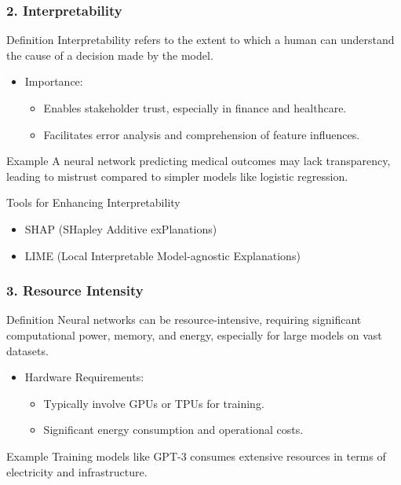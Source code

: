 \documentclass[aspectratio=169]{beamer}
\begin{document}
\begin{frame}[fragile]
    \frametitle{2. Interpretability}
    \begin{block}{Definition}
        Interpretability refers to the extent to which a human can understand the cause of a decision made by the model. 
    \end{block}
    \begin{itemize}
        \item Importance:
        \begin{itemize}
            \item Enables stakeholder trust, especially in finance and healthcare.
            \item Facilitates error analysis and comprehension of feature influences.
        \end{itemize}
    \end{itemize}
    \begin{block}{Example}
        A neural network predicting medical outcomes may lack transparency, leading to mistrust compared to simpler models like logistic regression.
    \end{block}
    \begin{block}{Tools for Enhancing Interpretability}
        \begin{itemize}
            \item SHAP (SHapley Additive exPlanations)
            \item LIME (Local Interpretable Model-agnostic Explanations)
        \end{itemize}
    \end{block}
\end{frame}

\begin{frame}[fragile]
    \frametitle{3. Resource Intensity}
    \begin{block}{Definition}
        Neural networks can be resource-intensive, requiring significant computational power, memory, and energy, especially for large models on vast datasets.
    \end{block}
    \begin{itemize}
        \item Hardware Requirements:
        \begin{itemize}
            \item Typically involve GPUs or TPUs for training.
            \item Significant energy consumption and operational costs.
        \end{itemize}
    \end{itemize}
    \begin{block}{Example}
        Training models like GPT-3 consumes extensive resources in terms of electricity and infrastructure.
    \end{block}
\end{frame}
\end{document}
